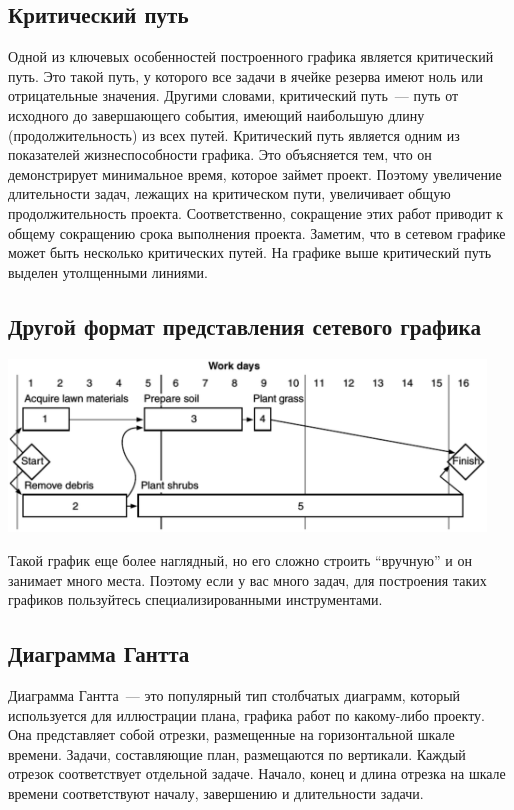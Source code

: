 \documentclass{../../text-style}
\begin{document}
\subsection{Критический путь}

Одной из ключевых особенностей построенного графика является критический путь. Это такой путь, у которого все задачи в ячейке резерва  имеют ноль или отрицательные значения. Другими словами, критический путь~--- путь от исходного до завершающего события, имеющий наибольшую длину (продолжительность) из всех путей. Критический путь является одним из показателей жизнеспособности графика. Это объясняется тем, что он демонстрирует минимальное время, которое займет проект. Поэтому увеличение длительности задач, лежащих на критическом пути, увеличивает общую продолжительность проекта. Соответственно, сокращение этих работ приводит к общему сокращению срока выполнения проекта. Заметим, что в сетевом графике может быть несколько критических путей. На графике выше критический путь выделен утолщенными линиями.

\subsection{Другой формат представления сетевого графика}

\begin{center}
    \includegraphics[width=0.95\textwidth]{otherGraphFormat.png}
\end{center}

Такой график еще более наглядный, но его сложно строить \enquote{вручную} и он занимает много места. Поэтому если у вас много задач, для построения таких графиков пользуйтесь специализированными инструментами.

\subsection{Диаграмма Гантта}

Диаграмма Гантта~--- это популярный тип столбчатых диаграмм, который используется для иллюстрации плана, графика работ по какому-либо проекту. Она представляет собой отрезки, размещенные на горизонтальной шкале времени. Задачи, составляющие план, размещаются по вертикали. Каждый отрезок соответствует отдельной задаче. Начало, конец и длина отрезка на шкале времени соответствуют началу, завершению и длительности задачи.
\end{document}
